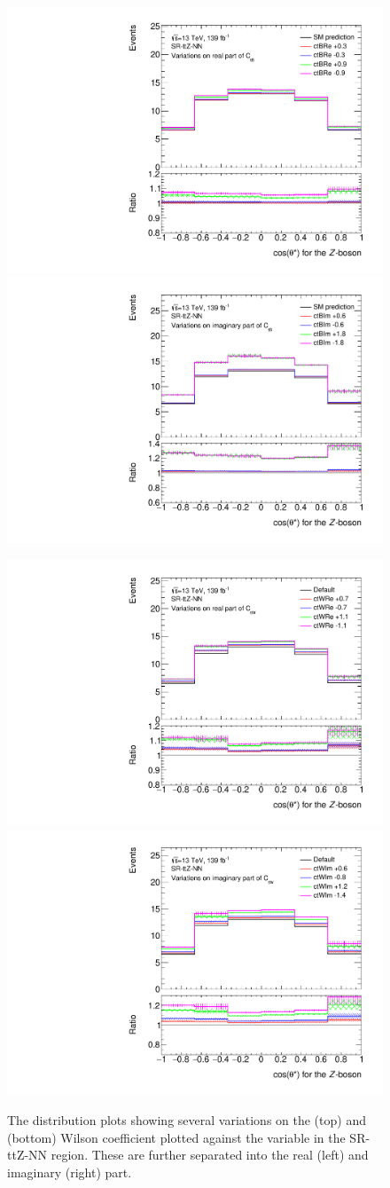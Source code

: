 \documentclass[bachelor,oneside, BCOR10mm,
			ngerman,english  %
]{GAUBM}
\begin{document}
\begin{figure}
	\centering
	\includegraphics[width=.42\textwidth]{figures/eft/ctBRe/cos_theta_starZ/_cos_theta_starZ_region00_ttZ.pdf}\hspace{8mm}
	\includegraphics[width=.42\textwidth]{figures/eft/ctBIm/cos_theta_starZ/_cos_theta_starZ_region00_ttZ.pdf}
	
	\includegraphics[width=.42\textwidth]{figures/eft/ctWRe/cos_theta_starZ/_cos_theta_starZ_region00_ttZ.pdf}\hspace{8mm}
	\includegraphics[width=.42\textwidth]{figures/eft/ctWIm/cos_theta_starZ/_cos_theta_starZ_region00_ttZ.pdf}
	\caption{The distribution plots showing several variations on the \ctB (top) and \ctW (bottom) Wilson coefficient plotted against the \cosstar variable in the SR-ttZ-NN region. These are further separated into the real (left) and imaginary (right) part.}
	\label{fig:EFTDistributions}
\end{figure}
\end{document}
